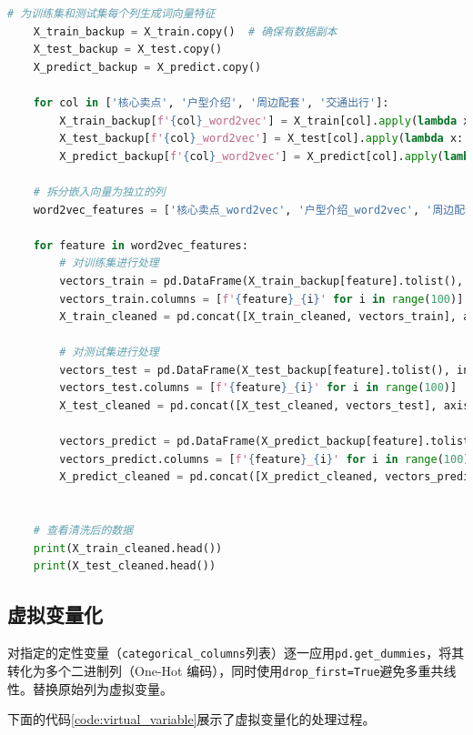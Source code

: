 \documentclass[
    report,     %
    oneside,    %
    UTF8,       %
    zihao=-4    %
]{config} %
\begin{document}
\begin{lstlisting}[label=code:word2vec, language=Python, caption=Word2Vec处理长文本数据的处理代码]
    # 为训练集和测试集每个列生成词向量特征
    X_train_backup = X_train.copy()  # 确保有数据副本
    X_test_backup = X_test.copy()
    X_predict_backup = X_predict.copy()
    
    for col in ['核心卖点', '户型介绍', '周边配套', '交通出行']:
        X_train_backup[f'{col}_word2vec'] = X_train[col].apply(lambda x: get_average_word2vec(x, word_vectors, 100))
        X_test_backup[f'{col}_word2vec'] = X_test[col].apply(lambda x: get_average_word2vec(x, word_vectors, 100))
        X_predict_backup[f'{col}_word2vec'] = X_predict[col].apply(lambda x: get_average_word2vec(x, word_vectors, 100))
    
    # 拆分嵌入向量为独立的列
    word2vec_features = ['核心卖点_word2vec', '户型介绍_word2vec', '周边配套_word2vec', '交通出行_word2vec']
    
    for feature in word2vec_features:
        # 对训练集进行处理
        vectors_train = pd.DataFrame(X_train_backup[feature].tolist(), index=X_train_backup.index)
        vectors_train.columns = [f'{feature}_{i}' for i in range(100)]  # 命名每个列
        X_train_cleaned = pd.concat([X_train_cleaned, vectors_train], axis=1)
        
        # 对测试集进行处理
        vectors_test = pd.DataFrame(X_test_backup[feature].tolist(), index=X_test_backup.index)
        vectors_test.columns = [f'{feature}_{i}' for i in range(100)]  # 命名每个列
        X_test_cleaned = pd.concat([X_test_cleaned, vectors_test], axis=1)
    
        vectors_predict = pd.DataFrame(X_predict_backup[feature].tolist(), index=X_predict_backup.index)
        vectors_predict.columns = [f'{feature}_{i}' for i in range(100)]  # 命名每个列
        X_predict_cleaned = pd.concat([X_predict_cleaned, vectors_predict], axis=1)
    
    
    # 查看清洗后的数据
    print(X_train_cleaned.head())
    print(X_test_cleaned.head())
\end{lstlisting}

\subsection{虚拟变量化}

对指定的定性变量（\lstinline|categorical_columns|列表）逐一应用\lstinline|pd.get_dummies|，将其转化为多个二进制列（One-Hot 编码），同时使用\lstinline|drop_first=True|避免多重共线性。替换原始列为虚拟变量。

下面的代码\ref{code:virtual_variable}展示了虚拟变量化的处理过程。
\end{document}
